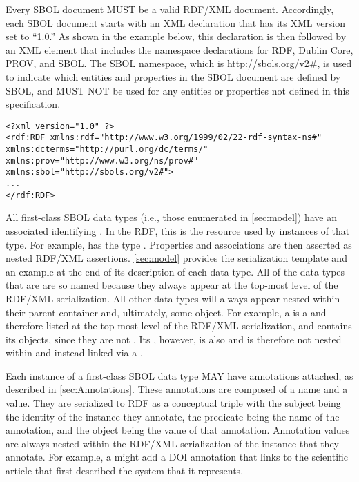 Every SBOL document MUST be a valid RDF/XML document. 
Accordingly, each SBOL document starts with an XML declaration that has its XML version set to ``1.0.'' As shown in the example below, this declaration is then followed by an  XML element that includes the namespace declarations for RDF, Dublin Core, PROV, and SBOL. The SBOL namespace, which is \url{http://sbols.org/v2#}, is used to indicate which entities and properties in the SBOL document are defined by SBOL, and MUST NOT be used for any entities or properties not defined in this specification.

\begin{lstlisting}
<?xml version="1.0" ?>
<rdf:RDF xmlns:rdf="http://www.w3.org/1999/02/22-rdf-syntax-ns#" xmlns:dcterms="http://purl.org/dc/terms/" xmlns:prov="http://www.w3.org/ns/prov#" xmlns:sbol="http://sbols.org/v2#">
...
</rdf:RDF>
\end{lstlisting}

All first-class SBOL data types (i.e., those enumerated in \ref{sec:model}) have an associated identifying . In the RDF, this is the resource  used by instances of that type. For example,  has the
type  .
Properties and associations are then asserted as nested RDF/XML assertions. 
\ref{sec:model} provides the serialization template and an example at the end of its description of each data type.
All of the data types that are  are so named because they always appear at the top-most level of the RDF/XML serialization. All other data types will always appear nested within their parent container and, ultimately, some  object.
For example, a  is a  and therefore listed at the top-most level of the RDF/XML serialization, and contains its   objects, since they are not .  Its , however, is also  and is therefore not nested within and instead linked via a .

Each instance of a first-class SBOL data type MAY have annotations attached, as described in \ref{sec:Annotations}. These annotations are composed of a name and a value.  They are serialized to RDF as a conceptual triple with the subject being the identity of the instance they annotate, the predicate being the name of the annotation, and the object being the value of that annotation. Annotation values are always nested within the RDF/XML serialization of the instance that they annotate.
For example, a  might add a DOI annotation that links to the scientific article that first described the system that it represents.

